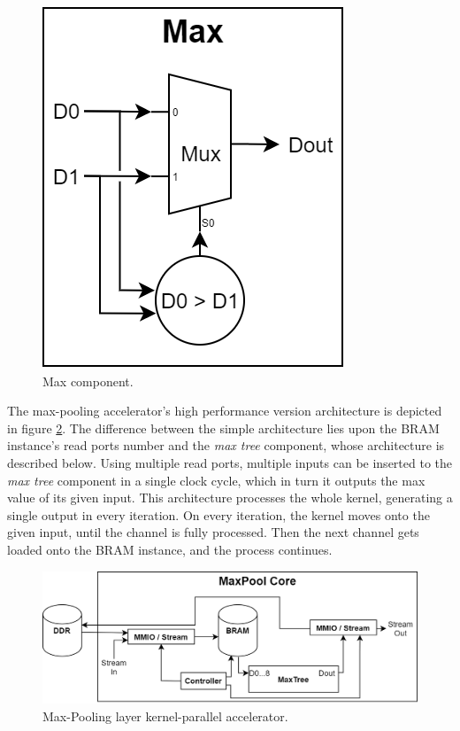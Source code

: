 \begin{figure} [H]
	\centering
	\includegraphics[scale=0.4]{Images/Platform/Max_component.png}
	\decoRule
	\caption[Max component]{Max component.}
	\label{fig:max-component}
\end{figure}

The max-pooling accelerator's high performance version architecture is depicted in figure \ref{fig:max-pool-core-kernel-parallel}. The difference between the simple architecture lies upon the BRAM instance's read ports number and the \emph{max tree} component, whose architecture is described below. Using multiple read ports, multiple inputs can be inserted to the \emph{max tree} component in a single clock cycle, which in turn it outputs the max value of its given input. This architecture processes the whole kernel, generating a single output in every iteration. On every iteration, the kernel moves onto the given input, until the channel is fully processed. Then the next channel gets loaded onto the BRAM instance, and the process continues.

\begin{figure} [H]
	\centering
	\includegraphics[width=\textwidth]{Images/Platform/MaxPool_core_kernel_parallel.png}
	\decoRule
	\caption[Max-Pooling layer kernel-parallel accelerator]{Max-Pooling layer kernel-parallel accelerator.}
	\label{fig:max-pool-core-kernel-parallel}
\end{figure}


